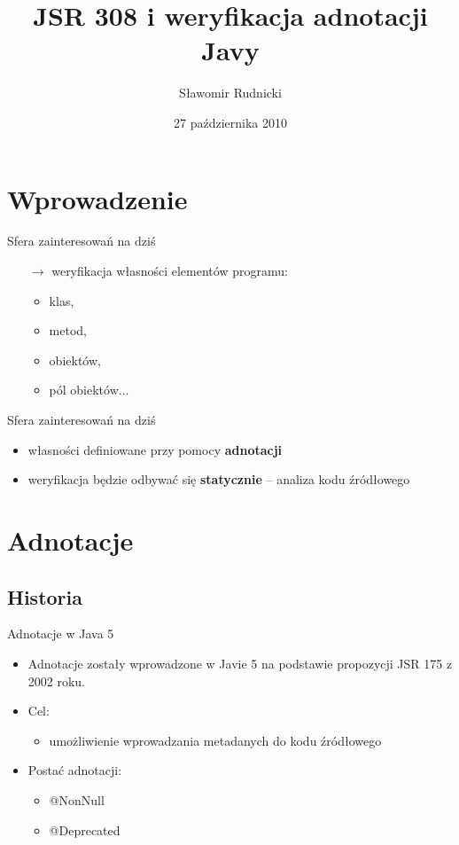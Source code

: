 \documentclass{beamer}
\title{JSR 308 i weryfikacja adnotacji Javy}
\author{Sławomir Rudnicki}
\institute{Niezawodność systemów współbieżnych i obiektowych}
\date{27 października 2010}
\begin{document}
\begin{frame}
  \titlepage
\end{frame}
\begin{frame}
  \tableofcontents
\end{frame}

\section{Wprowadzenie}

\begin{frame}{Sfera zainteresowań na dziś}
\begin{itemize}
\item[$\rightarrow$] weryfikacja własności elementów programu:
\begin{itemize}
\item klas, 
\item metod, 
\item obiektów, 
\item pól obiektów...
\end{itemize}
\end{itemize}
\end{frame}

\begin{frame}{Sfera zainteresowań na dziś}
\begin{itemize}
\item<1->[$\rightarrow$] własności definiowane przy pomocy \textbf{adnotacji}
\begin{center}

\end{center}
\item<2->[$\rightarrow$] weryfikacja będzie odbywać się \textbf{statycznie} -- analiza kodu źródłowego
\end{itemize}
\end{frame}

\section{Adnotacje}
\subsection{Historia}
\begin{frame}{Adnotacje w Java 5}
\begin{itemize}
\item<1-> Adnotacje zostały wprowadzone w Javie 5 na podstawie propozycji
  JSR 175 z 2002 roku.
\item<2-> Cel: 
\begin{itemize}
\item umożliwienie wprowadzania metadanych do kodu źródłowego
\end{itemize}
\item<3-> Postać adnotacji: 
\begin{itemize}
\item \color{red} @NonNull 
\item \color{red} @Deprecated
\end{itemize}
\end{itemize}
\end{frame}
\end{document}
